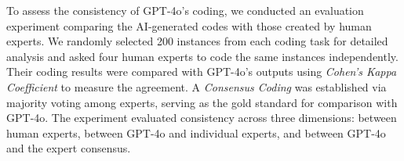 To assess the consistency of GPT-4o's coding, we conducted an evaluation experiment comparing the AI-generated codes with those created by human experts. We randomly selected 200 instances from each coding task for detailed analysis and asked four human experts to code the same instances independently. Their coding results were compared with GPT-4o's outputs using \textit{Cohen's Kappa Coefficient} to measure the agreement. A \textit{Consensus Coding} was established via majority voting among experts, serving as the gold standard for comparison with GPT-4o. The experiment evaluated consistency across three dimensions: between human experts, between GPT-4o and individual experts, and between GPT-4o and the expert consensus.




